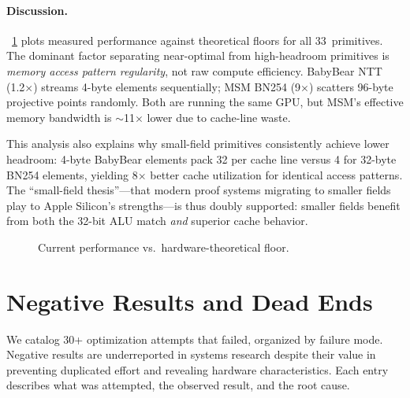 \paragraph{Discussion.}
\figurename~\ref{fig:floor-scatter} plots measured performance against theoretical floors for all 33~primitives.
The dominant factor separating near-optimal from high-headroom primitives is \emph{memory access pattern regularity}, not raw compute efficiency.
BabyBear NTT (1.2$\times$) streams 4-byte elements sequentially; MSM BN254 (9$\times$) scatters 96-byte projective points randomly.
Both are running the same GPU, but MSM's effective memory bandwidth is $\sim$11$\times$ lower due to cache-line waste.

This analysis also explains why small-field primitives consistently achieve lower headroom: 4-byte BabyBear elements pack 32 per cache line versus 4 for 32-byte BN254 elements, yielding 8$\times$ better cache utilization for identical access patterns.
The ``small-field thesis''---that modern proof systems migrating to smaller fields play to Apple Silicon's strengths---is thus doubly supported: smaller fields benefit from both the 32-bit ALU match \emph{and} superior cache behavior.

\begin{figure}[t]
\centering
\caption{Current performance vs.\ hardware-theoretical floor.}
\label{fig:floor-scatter}
\end{figure}



\section{Negative Results and Dead Ends}
\label{sec:dead-ends}

We catalog 30+ optimization attempts that failed, organized by failure mode.
Negative results are underreported in systems research despite their value in preventing duplicated effort and revealing hardware characteristics.
Each entry describes what was attempted, the observed result, and the root cause.

